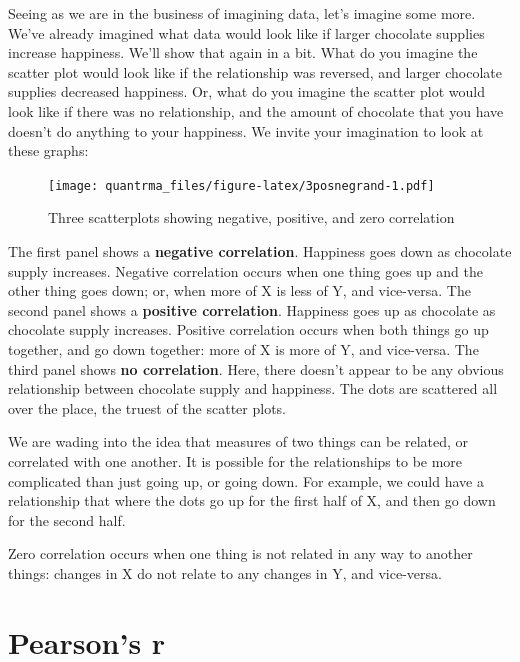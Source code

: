 \documentclass[
]{book}
\begin{document}
Seeing as we are in the business of imagining data, let's imagine some more. We've already imagined what data would look like if larger chocolate supplies increase happiness. We'll show that again in a bit. What do you imagine the scatter plot would look like if the relationship was reversed, and larger chocolate supplies decreased happiness. Or, what do you imagine the scatter plot would look like if there was no relationship, and the amount of chocolate that you have doesn't do anything to your happiness. We invite your imagination to look at these graphs:

\begin{figure}
\centering
\texttt{[image: quantrma\_files/figure-latex/3posnegrand-1.pdf]}
\caption{\label{fig:3posnegrand}Three scatterplots showing negative, positive, and zero correlation}
\end{figure}

The first panel shows a \textbf{negative correlation}. Happiness goes down as chocolate supply increases. Negative correlation occurs when one thing goes up and the other thing goes down; or, when more of X is less of Y, and vice-versa. The second panel shows a \textbf{positive correlation}. Happiness goes up as chocolate as chocolate supply increases. Positive correlation occurs when both things go up together, and go down together: more of X is more of Y, and vice-versa. The third panel shows \textbf{no correlation}. Here, there doesn't appear to be any obvious relationship between chocolate supply and happiness. The dots are scattered all over the place, the truest of the scatter plots.

\begin{marginnote}

We are wading into the idea that measures of two things can be related, or correlated with one another. It is possible for the relationships to be more complicated than just going up, or going down. For example, we could have a relationship that where the dots go up for the first half of X, and then go down for the second half.

\end{marginnote}

Zero correlation occurs when one thing is not related in any way to another things: changes in X do not relate to any changes in Y, and vice-versa.

\hypertarget{pearsons-r}{%
\section{Pearson's r}\label{pearsons-r}}
\end{document}
